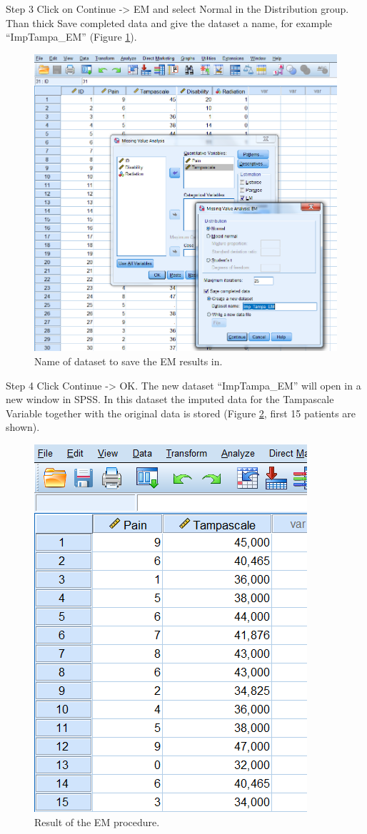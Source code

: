 \documentclass[]{book}
\begin{document}
Step 3 Click on Continue -\textgreater{} EM and select Normal in the
Distribution group. Than thick Save completed data and give the dataset
a name, for example ``ImpTampa\_EM'' (Figure \ref{fig:fig3-12}).

\begin{figure}

{\centering \includegraphics[width=0.7\linewidth]{images/fig3.12} 

}

\caption{Name of dataset to save the EM results in.}\label{fig:fig3-12}
\end{figure}

Step 4 Click Continue -\textgreater{} OK. The new dataset
``ImpTampa\_EM'' will open in a new window in SPSS. In this dataset the
imputed data for the Tampascale Variable together with the original data
is stored (Figure \ref{fig:fig3-13}, first 15 patients are shown).

\begin{figure}

{\centering \includegraphics[width=0.7\linewidth]{images/fig3.13} 

}

\caption{Result of the EM procedure.}\label{fig:fig3-13}
\end{figure}
\end{document}
